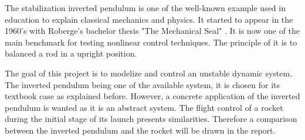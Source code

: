 %
%
%
%
%

The stabilization inverted pendulum is one of the well-known example used in education to explain classical mechanics and physics. It started to appear in the 1960's with Roberge's bachelor thesis "The Mechanical Seal" \citep{the article}. It is now one of the main benchmark for testing nonlinear control techniques. The principle of it is to balanced a rod in a upright position.

The goal of this project is to modelize and control an unstable dynamic system. The inverted pendulum being one of the available system, it is chosen for its textbook case as explained before. However, a concrete application of the inverted pendulum is wanted as it is an abstract system. The flight control of a rocket during the initial stage of its launch presents similarities. Therefore a comparison between the inverted pendulum and the rocket will be drawn in the report.